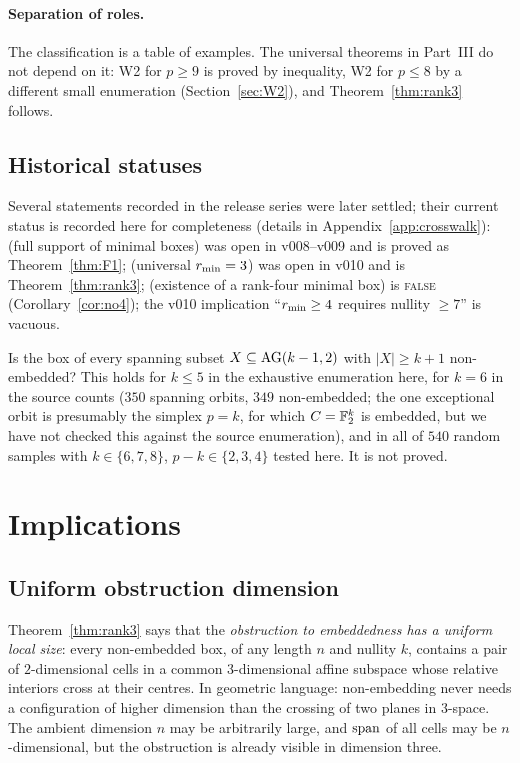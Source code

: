 \paragraph{Separation of roles.} The classification is a table of examples. The universal theorems in Part~III do not depend on it: W2 for $p\ge9$ is proved by inequality, W2 for $p\le8$ by a different small enumeration (Section~\ref{sec:W2}), and Theorem~\ref{thm:rank3} follows.

\subsection{Historical statuses}

Several statements recorded in the release series were later settled; their current status is recorded here for completeness (details in Appendix~\ref{app:crosswalk}):  (full support of minimal boxes) was open in v008--v009 and is proved as Theorem~\ref{thm:F1};  (universal $r_{\min}=3$) was open in v010 and is Theorem~\ref{thm:rank3};  (existence of a rank-four minimal box) is \textsc{false} (Corollary~\ref{cor:no4}); the v010 implication ``$r_{\min}\ge4$ requires nullity $\ge7$'' is vacuous.

\begin{question}\label{q:spanning}
Is the box of every spanning subset $X\subseteq\mathrm{AG}(k-1,2)$ with $|X|\ge k+1$ non-embedded? This holds for $k\le5$ in the exhaustive enumeration here, for $k=6$ in the source counts ($350$ spanning orbits, $349$ non-embedded; the one exceptional orbit is presumably the simplex $p=k$, for which $C=\mathbb F_2^k$ is embedded, but we have not checked this against the source enumeration), and in all of $540$ random samples with $k\in\{6,7,8\}$, $p-k\in\{2,3,4\}$ tested here. It is not proved.
\end{question}

\section{Implications}\label{sec:implications}

\subsection{Uniform obstruction dimension}

Theorem~\ref{thm:rank3} says that the \emph{obstruction to embeddedness has a uniform local size}: every non-embedded box, of any length $n$ and nullity $k$, contains a pair of $2$-dimensional cells in a common $3$-dimensional affine subspace whose relative interiors cross at their centres. In geometric language: non-embedding never needs a configuration of higher dimension than the crossing of two planes in $3$-space. The ambient dimension $n$ may be arbitrarily large, and $\operatorname{span}$ of all cells may be $n$-dimensional, but the obstruction is already visible in dimension three.

